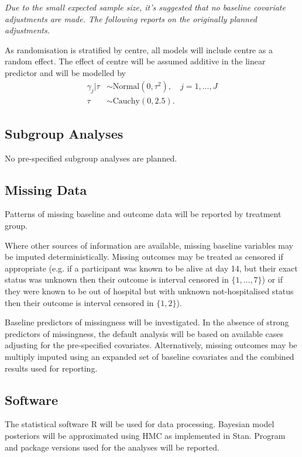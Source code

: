 \documentclass[11pt,parskip=half-]{scrartcl}
\begin{document}
\textit{Due to the small expected sample size, it's suggested that no baseline covariate adjustments are made. The following reports on the originally planned adjustments.}

As randomisation is stratified by centre, all models will include centre as a random effect. The effect of centre will be assumed additive in the linear predictor and will be modelled by
$$
    \begin{aligned}
        \gamma_j|\tau & \sim \text{Normal}(0, \tau^2), \quad j =1,...,J \\
        \tau          & \sim \text{Cauchy}(0, 2.5).
    \end{aligned}
$$

\subsection{Subgroup Analyses}
No pre-specified subgroup analyses are planned.

\subsection{Missing Data}
Patterns of missing baseline and outcome data will be reported by treatment group.

Where other sources of information are available, missing baseline variables may be imputed deterministically. Missing outcomes may be treated as censored if appropriate (e.g. if a participant was known to be alive at day 14, but their exact status was unknown then their outcome is interval censored in $\{1,...,7\}$) or if they were known to be out of hospital but with unknown not-hospitalised status then their outcome is interval censored in $\{1,2\}$).

Baseline predictors of missingness will be investigated. In the absence of strong predictors of missingness, the default analysis will be based on available cases adjusting for the pre-specified covariates. Alternatively, missing outcomes may be multiply imputed using an expanded set of baseline covariates and the combined results used for reporting.

\subsection{Software}
The statistical software R will be used for data processing. Bayesian model posteriors will be approximated using HMC as implemented in Stan. Program and package versions used for the analyses will be reported.
\end{document}
